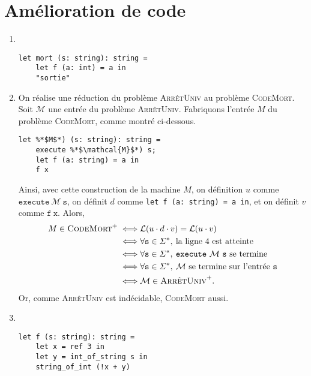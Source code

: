 \section{Amélioration de code}

\begin{enumerate}
	\item~
		\begin{lstlisting}[language=caml,caption=Fonction morte]
let mort (s: string): string =
	let f (a: int) = a in
	"sortie"
		\end{lstlisting}
	\item On réalise une réduction du problème \textsc{ArrêtUniv} au problème \textsc{CodeMort}.
		Soit $\mathcal{M}$\/ une entrée du problème \textsc{ArrêtUniv}.
		Fabriquons l'entrée $M$\/ du problème \textsc{CodeMort}, comme montré ci-dessous.
		\begin{lstlisting}[language=caml,caption=Réduction de \textsc{ArrêtUniv} à \textsc{CodeMort}]
let %*$M$*) (s: string): string =
	execute %*$\mathcal{M}$*) s;
	let f (a: string) = a in
	f x
		\end{lstlisting}
		Ainsi, avec cette construction de la machine $M$, on définition $u$ comme $\texttt{execute}\ \mathcal{M}\ \texttt{s}$, on définit $d$\/ comme \lstinline[language=caml,keepspaces]{let f (a: string) = a in}, et on définit $v$\/ comme $\texttt{f}\ \texttt{x}$.
		Alors,
		\begin{align*}
			M \in \textsc{CodeMort}^+ \iff& \mathcal{L}(u\cdot d\cdot v) = \mathcal{L}(u\cdot v) \\
			\iff& \forall \texttt{s} \in \Sigma^*,\: \text{la ligne 4 est atteinte} \\
			\iff& \forall \texttt{s} \in \Sigma^*,\: \texttt{execute}\ \mathcal{M}\ \texttt{s} \text{ se termine} \\
			\iff& \forall \texttt{s} \in \Sigma^*,\:\mathcal{M} \text{ se termine sur l'entrée } \texttt{s}\\
			\iff& \mathcal{M} \in \textsc{ArrêtUniv}^+.
		\end{align*}
		Or, comme \textsc{ArrêtUniv} est indécidable, \textsc{CodeMort} aussi.
	\item~
		\begin{lstlisting}[language=caml,caption=Variable constante]
let f (s: string): string =
	let x = ref 3 in
	let y = int_of_string s in
	string_of_int (!x + y)


\end{lstlisting}
\end{enumerate}
